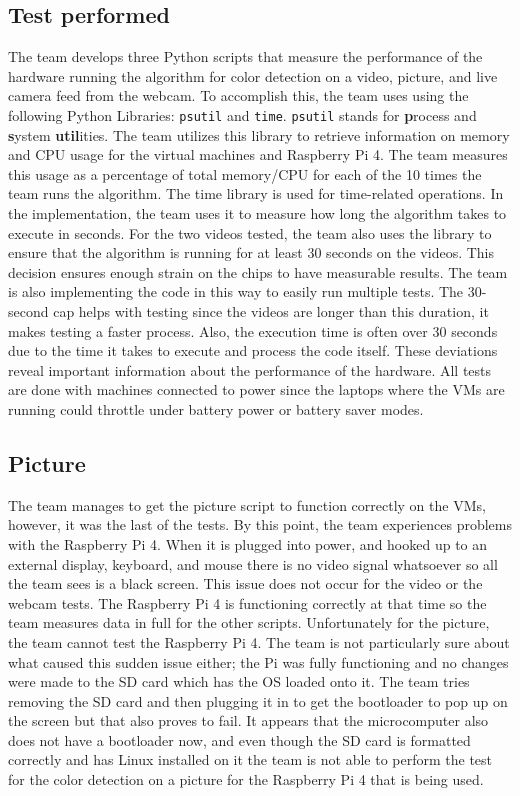 \subsection{Test performed}

The team develops three Python scripts that measure the performance
of the hardware running the algorithm for color detection on a video,
picture, and live camera feed from the webcam. To accomplish this, the team
uses using the following Python Libraries: \verb|psutil| and \verb|time|. \verb|psutil|
stands for \textbf{p}rocess and \textbf{s}ystem \textbf{util}ities. The team utilizes this
library to retrieve information on memory and CPU usage for the virtual
machines and Raspberry Pi 4. The team measures this usage as a percentage of total memory/CPU
for each of the 10 times the team runs the algorithm. The time library is used
for time-related operations. In the implementation, the team uses it to
measure how long the algorithm takes to execute in seconds. For the two
videos tested, the team also uses the library to ensure that the
algorithm is running for at least 30 seconds on the videos. This
decision ensures enough strain on the chips to have
measurable results. The team is also implementing the code in this way to
easily run multiple tests. The 30-second cap helps with testing
since the videos are longer than this duration, it makes testing a
faster process. Also, the execution time is
often over 30 seconds due to the time it takes to execute and process
the code itself. These deviations reveal important information about the
performance of the hardware. All tests are done with machines connected
to power since the laptops where the VMs are running could throttle
under battery power or battery saver modes.

\subsection{Picture}

The team manages to get the picture script to function correctly on the VMs,
however, it was the last of the tests. By this point, the team experiences
problems with the Raspberry Pi 4. When it is plugged into power, and
hooked up to an external display, keyboard, and mouse there is no
video signal whatsoever so all the team sees is a black screen. This issue does
not occur for the video or the webcam tests. The Raspberry Pi 4 is
functioning correctly at that time so the team measures data in full for the
other scripts. Unfortunately for the picture, the team cannot test the
Raspberry Pi 4. The team is not particularly sure about what caused this
sudden issue either; the Pi was fully functioning and no changes were
made to the SD card which has the OS loaded onto it. The team tries removing
the SD card and then plugging it in to get the
bootloader to pop up on the screen but that also proves to fail. It
appears that the microcomputer also does not have a bootloader now, and
even though the SD card is formatted correctly and has Linux installed
on it the team is not able to perform the test for the color detection on a
picture for the Raspberry Pi 4 that is being used.

